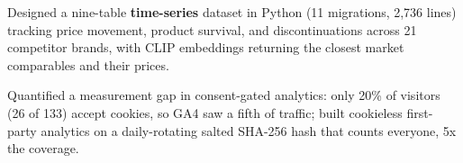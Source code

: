\documentclass[letterpaper,10pt]{article}
\newcommand{\resumeItem}[1]{
  \item\small{
    {#1 \vspace{-3pt}}
  }
}
\begin{document}
        \resumeItem{Designed a nine-table \textbf{time-series} dataset in Python (11 migrations, 2,736 lines) tracking price movement, product survival, and discontinuations across 21 competitor brands, with CLIP embeddings returning the closest market comparables and their prices.}
        \resumeItem{Quantified a measurement gap in consent-gated analytics: only 20\% of visitors (26 of 133) accept cookies, so GA4 saw a fifth of traffic; built cookieless first-party analytics on a daily-rotating salted SHA-256 hash that counts everyone, 5x the coverage.}
\end{document}
